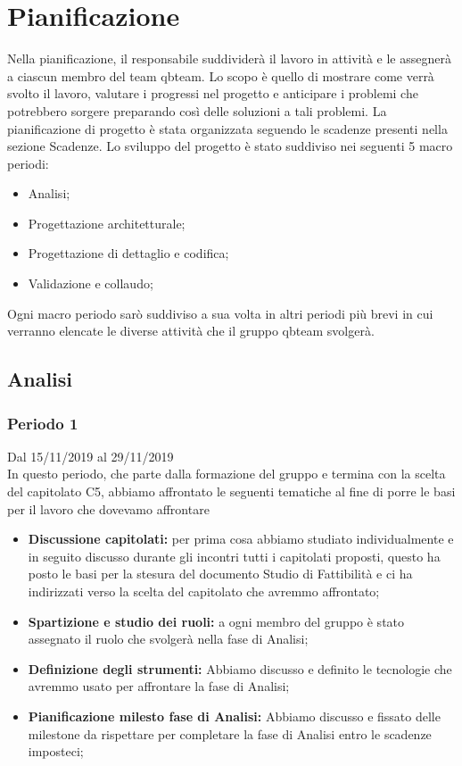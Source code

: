\section{Pianificazione}
Nella pianificazione, il responsabile suddividerà il lavoro in attività e le assegnerà a ciascun membro del team qbteam.
Lo scopo è quello di mostrare come verrà svolto il lavoro, valutare i progressi nel progetto e anticipare i problemi che potrebbero sorgere preparando così delle soluzioni a tali problemi. 
La pianiﬁcazione di progetto è stata organizzata seguendo le scadenze presenti nella sezione Scadenze.
Lo sviluppo del progetto è stato suddiviso nei seguenti 5 macro periodi: 
\begin{itemize}
	\item Analisi;
	\item Progettazione architetturale;
	\item Progettazione di dettaglio e codifica;
	\item Validazione e collaudo;
\end{itemize}
Ogni macro periodo sarò suddiviso a sua volta in altri periodi più brevi in cui verranno elencate le diverse attività che il gruppo qbteam svolgerà.


\subsection{Analisi}

\subsubsection{Periodo 1} 
Dal 15/11/2019 al 29/11/2019\\
In questo periodo, che parte dalla formazione del gruppo e termina con la scelta del capitolato C5, abbiamo affrontato le seguenti tematiche al fine di porre le basi per il lavoro che dovevamo affrontare\\
\begin{itemize}
	\item \textbf{Discussione capitolati:} per prima cosa abbiamo studiato individualmente e in seguito discusso durante gli incontri tutti i capitolati proposti, questo ha posto le basi per la stesura del documento Studio di Fattibilità e ci ha indirizzati verso la scelta del capitolato che avremmo affrontato;
	\item \textbf{Spartizione e studio dei ruoli:} a ogni membro del gruppo è stato assegnato il ruolo che svolgerà nella fase di Analisi;
	\item \textbf{Definizione degli strumenti:} Abbiamo discusso e definito le tecnologie che avremmo usato per affrontare la fase di Analisi;
	\item \textbf{Pianificazione milesto fase di Analisi:} Abbiamo discusso e fissato delle milestone da rispettare per completare la fase di Analisi entro le scadenze imposteci;
\end{itemize}
